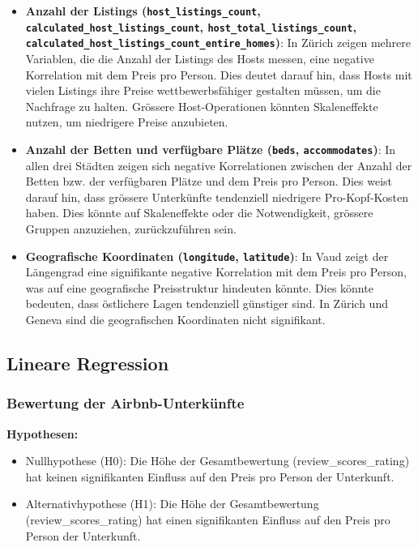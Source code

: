 \documentclass[
  journal,
]{IEEEtran}%
\providecommand{\tightlist}{%
  \setlength{\itemsep}{0pt}\setlength{\parskip}{0pt}}\usepackage{longtable,booktabs,array}
\begin{document}
\begin{itemize}
\item
  \textbf{Anzahl der Listings (\texttt{host\_listings\_count},
  \texttt{calculated\_host\_listings\_count},
  \texttt{host\_total\_listings\_count},
  \texttt{calculated\_host\_listings\_count\_entire\_homes})}: In Zürich
  zeigen mehrere Variablen, die die Anzahl der Listings des Hosts
  messen, eine negative Korrelation mit dem Preis pro Person. Dies
  deutet darauf hin, dass Hosts mit vielen Listings ihre Preise
  wettbewerbsfähiger gestalten müssen, um die Nachfrage zu halten.
  Grössere Host-Operationen könnten Skaleneffekte nutzen, um niedrigere
  Preise anzubieten.
\item
  \textbf{Anzahl der Betten und verfügbare Plätze (\texttt{beds},
  \texttt{accommodates})}: In allen drei Städten zeigen sich negative
  Korrelationen zwischen der Anzahl der Betten bzw. der verfügbaren
  Plätze und dem Preis pro Person. Dies weist darauf hin, dass grössere
  Unterkünfte tendenziell niedrigere Pro-Kopf-Kosten haben. Dies könnte
  auf Skaleneffekte oder die Notwendigkeit, grössere Gruppen anzuziehen,
  zurückzuführen sein.
\item
  \textbf{Geografische Koordinaten (\texttt{longitude},
  \texttt{latitude})}: In Vaud zeigt der Längengrad eine signifikante
  negative Korrelation mit dem Preis pro Person, was auf eine
  geografische Preisstruktur hindeuten könnte. Dies könnte bedeuten,
  dass östlichere Lagen tendenziell günstiger sind. In Zürich und Geneva
  sind die geografischen Koordinaten nicht signifikant.
\end{itemize}

\hypertarget{lineare-regression-1}{%
\subsection{\texorpdfstring{\textbf{Lineare
Regression}}{Lineare Regression}}\label{lineare-regression-1}}

\hypertarget{bewertung-der-airbnb-unterkuxfcnfte}{%
\subsubsection{Bewertung der
Airbnb-Unterkünfte}\label{bewertung-der-airbnb-unterkuxfcnfte}}

\textbf{Hypothesen:}

\begin{itemize}
\tightlist
\item
  Nullhypothese (H0): Die Höhe der Gesamtbewertung
  (review\_scores\_rating) hat keinen signifikanten Einfluss auf den
  Preis pro Person der Unterkunft.
\item
  Alternativhypothese (H1): Die Höhe der Gesamtbewertung
  (review\_scores\_rating) hat einen signifikanten Einfluss auf den
  Preis pro Person der Unterkunft.
\end{itemize}
\end{document}
